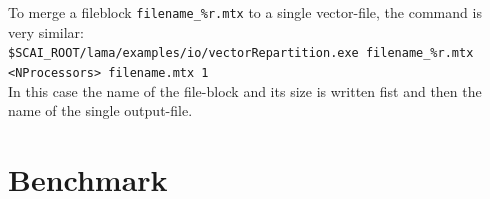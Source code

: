 \documentclass[pdftex,a4paper,parskip,listof=totoc,bibliography=totoc,onehalfspacing,12pt]{scrreprt}
\newcommand{\shellcmd}[1]{\indent\indent\texttt{#1}}	%
\newcommand{\shellcmdline}[1]{\indent\indent\texttt{\quad#1}} 	%
\begin{document}
To merge a fileblock \shellcmd{filename\_\%r.mtx} to a single vector-file, the command is very similar:\\
\shellcmdline{\$SCAI\_ROOT/lama/examples/io/vectorRepartition.exe filename\_\%r.mtx}\\
\shellcmdline{<NProcessors> filename.mtx 1}\\
In this case the name of the file-block and its size is written fist and then the name of the single output-file.

\section{Benchmark}


\cleardoublepage
\listoffigures 
{}
\listoftables
{}
\cleardoublepage


\end{document}
